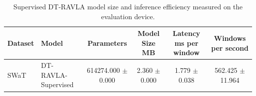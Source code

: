 \begin{table}[t]
\centering
\caption{Supervised DT-RAVLA model size and inference efficiency measured on the evaluation device.}
\label{tab:efficiency}
\renewcommand{\arraystretch}{1.12}
\setlength{\tabcolsep}{4pt}
\begin{tabular}{llcccc}
\hline
Dataset & Model & Parameters & Model Size MB & Latency ms per window & Windows per second \\
\hline
SWaT & DT-RAVLA-Supervised & 614274.000 $\pm$ 0.000 & 2.360 $\pm$ 0.000 & 1.779 $\pm$ 0.038 & 562.425 $\pm$ 11.964 \\
\hline
\end{tabular}
\end{table}